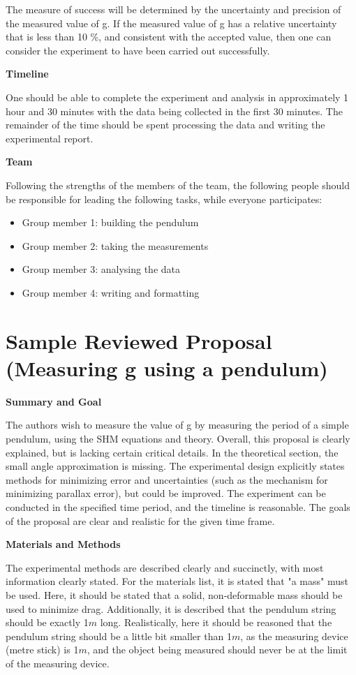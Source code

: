 The measure of success will be determined by the uncertainty and precision of the measured value of g. If the measured value of g has a relative uncertainty that is less than 10 \%, and consistent with the accepted value, then one can consider the experiment to have been carried out successfully. 

\textbf{Timeline}

One should be able to complete the experiment and analysis in approximately 1 hour and 30 minutes with the data being collected in the first 30 minutes. The remainder of the time should be spent processing the data and writing the experimental report.  

\textbf{Team}

Following the strengths of the members of the team, the following people should be responsible for leading the following tasks, while everyone participates:

\begin{itemize}
\item Group member 1: building the pendulum
\item Group member 2: taking the measurements
\item Group member 3: analysing the data
\item Group member 4: writing and formatting
\end{itemize}

 \vspace{0.25cm}
\section{Sample Reviewed Proposal (Measuring g using a pendulum)}
 \vspace{0.25cm}
\textbf{Summary and Goal}

The authors wish to measure the value of g by measuring the period of a simple pendulum, using the SHM equations and theory. Overall, this proposal is clearly explained, but is lacking certain critical details. In the theoretical section, the small angle approximation is missing. The experimental design explicitly states methods for minimizing error and uncertainties (such as the mechanism for minimizing parallax error), but could be improved. The experiment can be conducted in the specified time period, and the timeline is reasonable. The goals of the proposal are clear and realistic for the given time frame. 

\textbf{Materials and Methods}

The experimental methods are described clearly and succinctly, with most information clearly stated. For the materials list, it is stated that "a mass" must be used. Here, it should be stated that a solid, non-deformable mass should be used to minimize drag. Additionally, it is described that the pendulum string should be exactly 1$\si{m}$ long. Realistically, here it should be reasoned that the pendulum string should be a little bit smaller than 1$\si{m}$, as the measuring device (metre stick) is 1$\si{m}$, and the object being measured should never be at the limit of the measuring device. 

